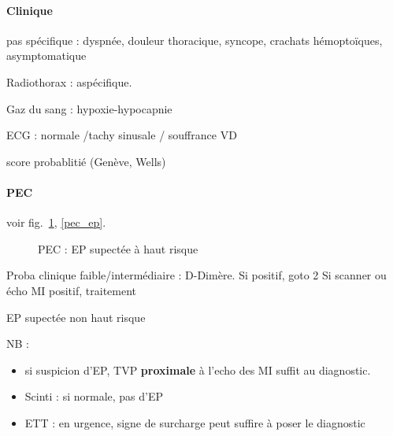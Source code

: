 \documentclass{article}
\begin{document}
\paragraph{Clinique} pas spécifique : dyspnée, douleur thoracique, syncope,
crachats hémoptoïques, asymptomatique

Radiothorax : aspécifique. 

Gaz du sang : hypoxie-hypocapnie

ECG : normale /tachy sinusale / souffrance VD

\thus score probablitié (Genève, Wells)

\paragraph{PEC} voir fig.~\ref{fig:pec_ep_risque}, \ref{pec_ep}.
\begin{figure}[htpb]                    
  \centering                              
  \caption{PEC : EP supectée à haut risque}
  \label{fig:pec_ep_risque}  
\end{figure}                            

\begin{algorithm}
  Proba clinique faible/intermédiaire : D-Dimère. Si positif, goto 2\;
  Si scanner ou écho MI positif, traitement\;
  \caption{EP supectée non haut risque}
  \label{fig:pec_ep}
\end{algorithm}

NB : 
\begin{itemize}
  \item si suspicion d'EP, TVP \textbf{proximale} à l'echo des MI suffit au
diagnostic.
  \item Scinti : si normale, pas d'EP
  \item ETT : en urgence, signe de surcharge peut suffire à poser le diagnostic
\end{itemize}
\end{document}

